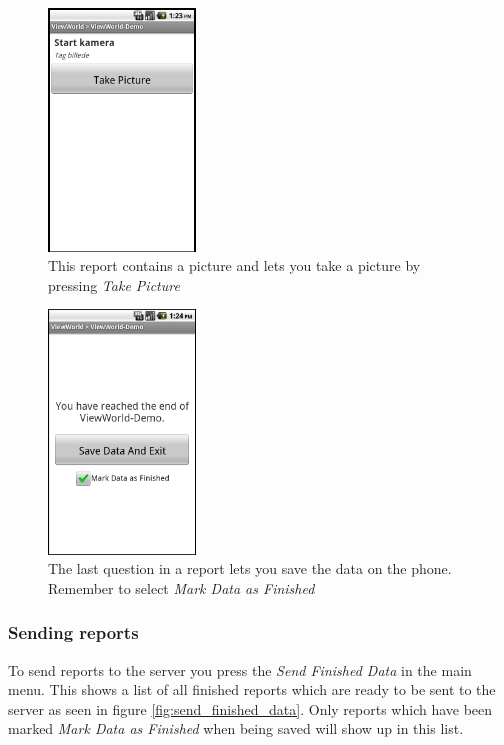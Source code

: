 \documentclass[a4paper, 12pt, final]{article}
\begin{document}
\begin{figure}[H]
  \centering
      \includegraphics[width=0.35\textwidth]{pics/new_report_picture.png}
  \caption{This report contains a picture and lets you take a picture by pressing \emph{Take Picture}}
  \label{fig:new_report_picture}
\end{figure}

\begin{figure}[H]
  \centering
      \includegraphics[width=0.35\textwidth]{pics/new_report_finished.png}
  \caption{The last question in a report lets you save the data on the phone. Remember to select \emph{Mark Data as Finished}}
  \label{fig:new_report_finished}
\end{figure}

\subsubsection{Sending reports}

To send reports to the server you press the \emph{Send Finished Data} in the main menu. This shows a list of all finished reports which are ready to be sent to the server as seen in figure \ref{fig:send_finished_data}. Only reports which have been marked \emph{Mark Data as Finished} when being saved will show up in this list.
\end{document}
